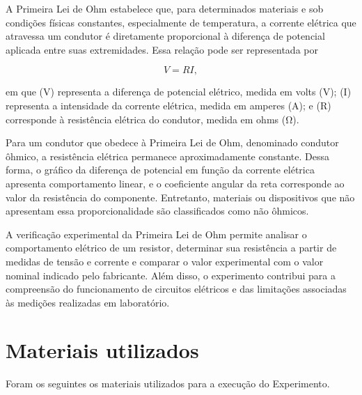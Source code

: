 \documentclass[a4paper,12pt]{article}
\begin{document}
A Primeira Lei de Ohm estabelece que, para determinados materiais e sob condições físicas constantes, especialmente de temperatura, a corrente elétrica que atravessa um condutor é diretamente proporcional à diferença de potencial aplicada entre suas extremidades. Essa relação pode ser representada por

\begin{equation}
V = R I,
\label{eq:primeira_lei_ohm}
\end{equation}

em que (V) representa a diferença de potencial elétrico, medida em volts (\si{\volt}); (I) representa a intensidade da corrente elétrica, medida em amperes (\si{\ampere}); e (R) corresponde à resistência elétrica do condutor, medida em ohms (\si{\ohm}).

Para um condutor que obedece à Primeira Lei de Ohm, denominado condutor ôhmico, a resistência elétrica permanece aproximadamente constante. Dessa forma, o gráfico da diferença de potencial em função da corrente elétrica apresenta comportamento linear, e o coeficiente angular da reta corresponde ao valor da resistência do componente. Entretanto, materiais ou dispositivos que não apresentam essa proporcionalidade são classificados como não ôhmicos.

A verificação experimental da Primeira Lei de Ohm permite analisar o comportamento elétrico de um resistor, determinar sua resistência a partir de medidas de tensão e corrente e comparar o valor experimental com o valor nominal indicado pelo fabricante. Além disso, o experimento contribui para a compreensão do funcionamento de circuitos elétricos e das limitações associadas às medições realizadas em laboratório.

\section{Materiais utilizados}

Foram os seguintes os materiais utilizados para a execução do Experimento.
\end{document}
